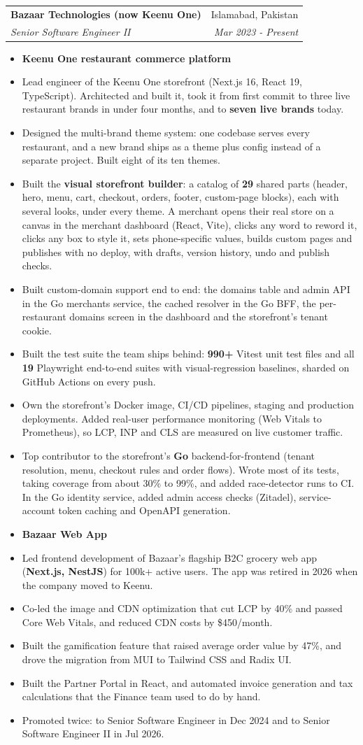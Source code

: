 \documentclass[letterpaper,11pt]{article}
\makeatletter
\newcommand{\resumeItem}[1]{\item\small{#1\vspace{-2pt}}}
\newcommand{\resumeSubheading}[4]{
  \vspace{3pt}\item
    \begin{tabular*}{0.97\textwidth}[t]{l@{\extracolsep{\fill}}r}
      \textbf{#1} & #2 \\
      \textit{\small#3} & \textit{\small#4} \\
    \end{tabular*}\vspace{-7pt}
}
\newcommand{\resumeGroup}[1]{\item[]\hspace{-12pt}\small\textbf{#1}\vspace{-2pt}}
\newcommand{\resumeItemListStart}{\begin{itemize}}
\newcommand{\resumeItemListEnd}{\end{itemize}\vspace{-5pt}}
\makeatother
\begin{document}
  \resumeSubheading
    {Bazaar Technologies (now Keenu One)}{Islamabad, Pakistan}
    {Senior Software Engineer II}{Mar 2023 - Present}
    \resumeItemListStart
      \resumeGroup{Keenu One restaurant commerce platform}
      \resumeItem{Lead engineer of the Keenu One storefront (Next.js 16, React 19, TypeScript). Architected and built it, took it from first commit to three live restaurant brands in under four months, and to \textbf{seven live brands} today.}
      \resumeItem{Designed the multi-brand theme system: one codebase serves every restaurant, and a new brand ships as a theme plus config instead of a separate project. Built eight of its ten themes.}
      \resumeItem{Built the \textbf{visual storefront builder}: a catalog of \textbf{29} shared parts (header, hero, menu, cart, checkout, orders, footer, custom-page blocks), each with several looks, under every theme. A merchant opens their real store on a canvas in the merchant dashboard (React, Vite), clicks any word to reword it, clicks any box to style it, sets phone-specific values, builds custom pages and publishes with no deploy, with drafts, version history, undo and publish checks.}
      \resumeItem{Built custom-domain support end to end: the domains table and admin API in the Go merchants service, the cached resolver in the Go BFF, the per-restaurant domains screen in the dashboard and the storefront's tenant cookie.}
      \resumeItem{Built the test suite the team ships behind: \textbf{990+} Vitest unit test files and all \textbf{19} Playwright end-to-end suites with visual-regression baselines, sharded on GitHub Actions on every push.}
      \resumeItem{Own the storefront's Docker image, CI/CD pipelines, staging and production deployments. Added real-user performance monitoring (Web Vitals to Prometheus), so LCP, INP and CLS are measured on live customer traffic.}
      \resumeItem{Top contributor to the storefront's \textbf{Go} backend-for-frontend (tenant resolution, menu, checkout rules and order flows). Wrote most of its tests, taking coverage from about 30\% to 99\%, and added race-detector runs to CI. In the Go identity service, added admin access checks (Zitadel), service-account token caching and OpenAPI generation.}
      \resumeGroup{Bazaar Web App}
      \resumeItem{Led frontend development of Bazaar's flagship B2C grocery web app (\textbf{Next.js, NestJS}) for 100k+ active users. The app was retired in 2026 when the company moved to Keenu.}
      \resumeItem{Co-led the image and CDN optimization that cut LCP by 40\% and passed Core Web Vitals, and reduced CDN costs by \$450/month.}
      \resumeItem{Built the gamification feature that raised average order value by 47\%, and drove the migration from MUI to Tailwind CSS and Radix UI.}
      \resumeItem{Built the Partner Portal in React, and automated invoice generation and tax calculations that the Finance team used to do by hand.}
      \resumeItem{Promoted twice: to Senior Software Engineer in Dec 2024 and to Senior Software Engineer II in Jul 2026.}
    \resumeItemListEnd
\end{document}
